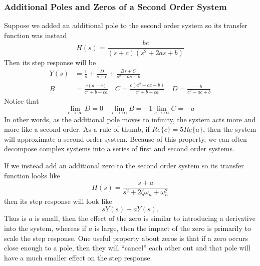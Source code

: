 \subsubsection{Additional Poles and Zeros of a Second Order System}
Suppose we added an additional pole to the second order system so its transfer function was instead
\[
  H(s) = \frac{bc}{(s+c)(s^2+2as+b)}
\]
Then its step response will be
\begin{align*}
  Y(s) &= \frac{1}{s}+\frac{D}{s+c}+\frac{Bs+C}{s^2+as+b}\\
  B &= \frac{c(a-c)}{c^2+b-ca}\quad C = \frac{c(a^2-ac-b)}{c^2+b-ca} \quad D = \frac{-b}{c^2-ac+b}
\end{align*}
Notice that
\[
  \lim_{c\to\infty} D = 0 \quad \lim_{c\to\infty} B = -1 \lim_{c\to\infty} C = -a
\]
In other words, as the additional pole moves to infinity, the system acts more and more like a second-order. As a rule of thumb, if $Re\{c\}=5Re\{a\}$, then the system will approximate a second order system.
Because of this property, we can often decompose complex systems into a series of first and second order systems.

If we instead add an additional zero to the second order system so its transfer function looks like
\[
  H(s) = \frac{s+a}{s^2+2\zeta\omega_n+\omega_n^2}
\]
then its step response will look like
\[
  sY(s) + aY(s).
\]
Thus is $a$ is small, then the effect of the zero is similar to introducing a derivative into the system, whereas if $a$ is large, then the impact of the zero is primarily to scale the step response.
One useful property about zeros is that if a zero occurs close enough to a pole, then they will ``cancel'' each other out and that pole will have a much smaller effect on the step response.
